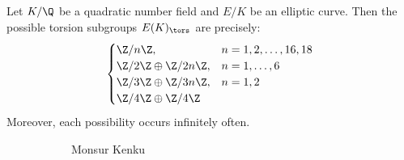 \begin{frame}[plain]
\begin{thm}
 Let $K/\Q$ be a quadratic number field and $E/K$ be an elliptic curve. Then the possible torsion subgroups $E(K)_\tors$ are precisely:
 	\[
	\begin{cases}
	\Z/n\Z, & n=1,2,\ldots,16,18 \\
	\Z/2\Z \oplus \Z/2n\Z, & n=1,\ldots,6 \\
	\Z/3\Z \oplus \Z/3n\Z, & n=1,2 \\
	\Z/4\Z \oplus \Z/4\Z
	\end{cases}
	\]
Moreover, each possibility occurs infinitely often. 
\end{thm}
	\begin{figure}[h]
	\centering
	\begin{subfigure}{0.3\textwidth}
	\captionsetup{labelformat=empty}
	\centering
	\caption{Monsur Kenku}
	\end{subfigure} \;\;\;
	\begin{subfigure}{0.3\textwidth}
	\captionsetup{labelformat=empty}
	\centering

\end{subfigure}
\end{figure}
\end{frame}
